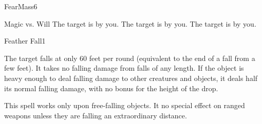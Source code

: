 \begin{spellsection}{Fear}{Mass}{6}
\begin{spellheader}
\end{spellheader}
\begin{spellcontent}
    \begin{spelltargetinginfo}
    \end{spelltargetinginfo}
    \begin{spelleffects}
        \begin{spellattack}{Magic vs. Will}
            \spellsuccess The target is \frightened by you.
            \spellcritical The target is \panicked by you.
            \spellfailure The target is \shaken by you.
        \end{spellattack}
        \spelldur \durshort \dismissable
    \end{spelleffects}
\end{spellcontent}
\begin{spellfooter}
\end{spellfooter}
\end{spellsection}

\begin{spellsection}{Feather Fall}{1}
\begin{spellheader}
\end{spellheader}
\begin{spellcontent}
    \begin{spelltargetinginfo}
        \spellrng{\rngmed}
    \end{spelltargetinginfo}
    \begin{spelleffects}
        \spelleffect The target falls at only 60 feet per round (equivalent to the end of a fall from a few feet). It takes no falling damage from falls of any length. If the object is heavy enough to deal falling damage to other creatures and objects, it deals half its normal falling damage, with no bonus for the height of the drop.
        \spelldur \durshort
    \end{spelleffects}
\end{spellcontent}
\begin{spellfooter}
    \spellnotes This spell works only upon free-falling objects. It no special effect on ranged weapons unless they are falling an extraordinary distance.
\end{spellfooter}
\end{spellsection}

